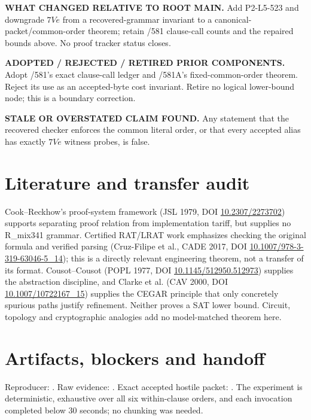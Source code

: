 \documentclass[11pt]{article}
\begin{document}
\textbf{WHAT CHANGED RELATIVE TO ROOT MAIN.} Add P2-L5-523 and downgrade $7Ve$ from a recovered-grammar invariant to a canonical-packet/common-order theorem; retain /581 clause-call counts and the repaired bounds above. No proof tracker status closes.

\textbf{ADOPTED / REJECTED / RETIRED PRIOR COMPONENTS.} Adopt /581's exact clause-call ledger and /581A's fixed-common-order theorem. Reject its use as an accepted-byte cost invariant. Retire no logical lower-bound node; this is a boundary correction.

\textbf{STALE OR OVERSTATED CLAIM FOUND.} Any statement that the recovered checker enforces the common literal order, or that every accepted alias has exactly $7Ve$ witness probes, is false.

\section*{Literature and transfer audit}
Cook--Reckhow's proof-system framework (JSL 1979, DOI \href{https://doi.org/10.2307/2273702}{10.2307/2273702}) supports separating proof relation from implementation tariff, but supplies no R\_mix341 grammar. Certified RAT/LRAT work emphasizes checking the original formula and verified parsing (Cruz-Filipe et al., CADE 2017, DOI \href{https://doi.org/10.1007/978-3-319-63046-5_14}{10.1007/978-3-319-63046-5\_14}); this is a directly relevant engineering theorem, not a transfer of its format. Cousot--Cousot (POPL 1977, DOI \href{https://doi.org/10.1145/512950.512973}{10.1145/512950.512973}) supplies the abstraction discipline, and Clarke et al. (CAV 2000, DOI \href{https://doi.org/10.1007/10722167_15}{10.1007/10722167\_15}) supplies the CEGAR principle that only concretely spurious paths justify refinement. Neither proves a SAT lower bound. Circuit, topology and cryptographic analogies add no model-matched theorem here.

\section*{Artifacts, blockers and handoff}
Reproducer: . Raw evidence: . Exact accepted hostile packet: . The experiment is deterministic, exhaustive over all six within-clause orders, and each invocation completed below 30 seconds; no chunking was needed.
\end{document}
